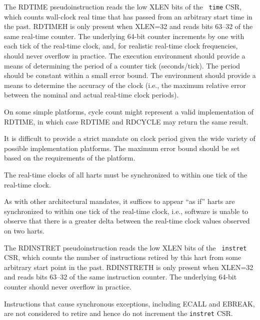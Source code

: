 The RDTIME pseudoinstruction reads the low XLEN bits of the {\tt
  time} CSR, which counts wall-clock real time that has passed from an
arbitrary start time in the past.
RDTIMEH is only present when XLEN=32 and reads bits 63--32 of the same
real-time counter.
The underlying 64-bit counter increments by one with each tick of the
real-time clock, and, for realistic real-time clock frequencies, should never
overflow in practice.
The execution environment should provide a means of determining the period of
a counter tick (seconds/tick).
The period should be constant within a small error bound.
The environment should provide a means to determine the accuracy of the clock
(i.e., the maximum relative error between the nominal and actual real-time
clock periods).

\begin{commentary}
On some simple platforms, cycle count might represent a valid
implementation of RDTIME, in which case RDTIME and RDCYCLE may
return the same result.

It is difficult to provide a strict mandate on clock period given the
wide variety of possible implementation platforms.  The maximum error
bound should be set based on the requirements of the platform.
\end{commentary}

The real-time clocks of all harts
must be synchronized to within one tick of the real-time clock.

\begin{commentary}
As with other architectural mandates, it suffices to appear ``as if''
harts are synchronized to within one tick of the real-time clock,
i.e., software is unable to observe that there is a greater delta
between the real-time clock values observed on two harts.
\end{commentary}

The RDINSTRET pseudoinstruction reads the low XLEN bits of the {\tt
  instret} CSR, which counts the number of instructions retired by
this hart from some arbitrary start point in the past.  RDINSTRETH is
only present when XLEN=32 and reads bits 63--32 of the same
instruction counter. The underlying 64-bit counter should never
overflow in practice.

\begin{commentary}
Instructions that cause synchronous exceptions, including ECALL and EBREAK,
are not considered to retire and hence do not increment the {\tt instret} CSR.
\end{commentary}

